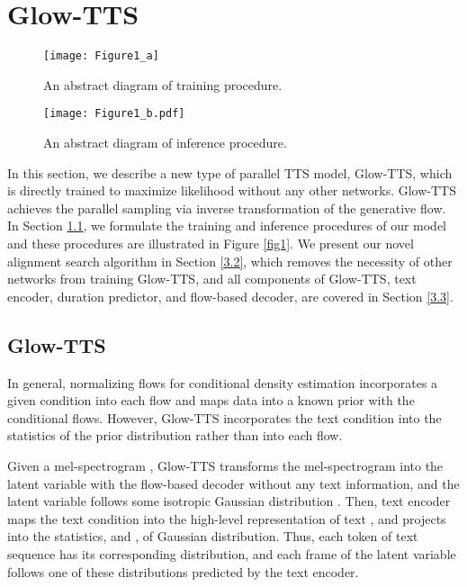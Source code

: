 \documentclass{article}
\begin{document}
\section{Glow-TTS}
\begin{figure*}
    \centering
    \begin{subfigure}[b]{.49\textwidth}
        \centering
        \texttt{[image: Figure1\_a]}
        \caption{An abstract diagram of training procedure.}
        \label{fig1:figure_a}
    \end{subfigure}\hfill \begin{subfigure}[b]{.49\textwidth}
        \centering
        \texttt{[image: Figure1\_b.pdf]}
        \caption{An abstract diagram of inference procedure.}
        \label{fig1:figure_b}
    \end{subfigure}
    \caption{Training and inference procedures of Glow-TTS.}
    \label{fig1}
\end{figure*}

In this section, we describe a new type of parallel TTS model, Glow-TTS, which is directly trained to maximize likelihood without any other networks. Glow-TTS achieves the parallel sampling via inverse transformation of the generative flow. In Section \ref{3.1}, we formulate the training and inference procedures of our model and these procedures are illustrated in Figure \ref{fig1}. We present our novel alignment search algorithm in Section \ref{3.2}, which removes the necessity of other networks from training Glow-TTS, and all components of Glow-TTS, text encoder, duration predictor, and flow-based decoder, are covered in Section \ref{3.3}.

\subsection{Glow-TTS}

\label{3.1}
In general, normalizing flows for conditional density estimation incorporates a given condition into each flow and maps data into a known prior with the conditional flows. However, Glow-TTS incorporates the text condition into the statistics of the prior distribution rather than into each flow.  

Given a mel-spectrogram , Glow-TTS transforms the mel-spectrogram  into the latent variable  with the flow-based decoder  without any text information, and the latent variable  follows some isotropic Gaussian distribution . Then, text encoder  maps the text condition  into the high-level representation of text , and projects  into the statistics,  and , of Gaussian distribution. Thus, each token of text sequence has its corresponding distribution, and each frame of the latent variable  follows one of these distributions predicted by the text encoder.
\end{document}
